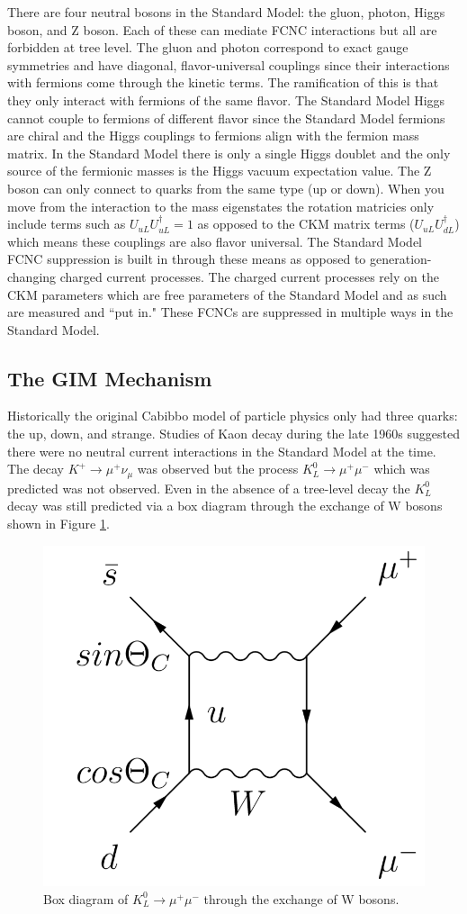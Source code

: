 There are four neutral bosons in the Standard Model: the gluon, photon, Higgs boson, and Z boson.  Each of these can mediate FCNC interactions but all are forbidden at tree level.  The gluon and photon correspond to exact gauge symmetries and have diagonal, flavor-universal couplings since their interactions with fermions come through the kinetic terms.  The ramification of this is that they only interact with fermions of the same flavor.  The Standard Model Higgs cannot couple to fermions of different flavor since the Standard Model fermions are chiral and the Higgs couplings to fermions align with the fermion mass matrix.  In the Standard Model there is only a single Higgs doublet and the only source of the fermionic masses is the Higgs vacuum expectation value.  The Z boson can only connect to quarks from the same type (up or down).  When you move from the interaction to the mass eigenstates the rotation matricies only include terms such as $U_{uL}U_{uL}^\dagger = 1$ as opposed to the CKM matrix terms ($U_{uL}U_{dL}^\dagger$) which means these couplings are also flavor universal. 
The Standard Model FCNC suppression is built in through these means as opposed to generation-changing charged current processes.  The charged current processes rely on the CKM parameters which are free parameters of the Standard Model and as such are measured and ``put in."  These FCNCs are suppressed in multiple ways in the Standard Model.

\subsection{The GIM Mechanism}
Historically the original Cabibbo model of particle physics only had three quarks: the up, down, and strange.  Studies of Kaon decay during the late 1960s suggested there were no neutral current interactions in the Standard Model at the time.  The decay $K^+ \rightarrow \mu^+ \nu_\mu$ was observed but the process $K_L^0 \rightarrow \mu^+ \mu^- $ which was predicted was not observed.  Even in the absence of a tree-level decay the $K_L^0$ decay was still predicted via a box diagram through the exchange of W bosons shown in Figure \ref{fig:KaonBox}.

\begin{figure}[h!]
	\centering
	\includegraphics[width=.4\columnwidth]{../ThesisImages/Theory/GIMDiagramsa.png}
	\caption{Box diagram of $K_L^0 \rightarrow \mu^+ \mu^-$ through the exchange of W bosons.}
	\label{fig:KaonBox}
\end{figure}

